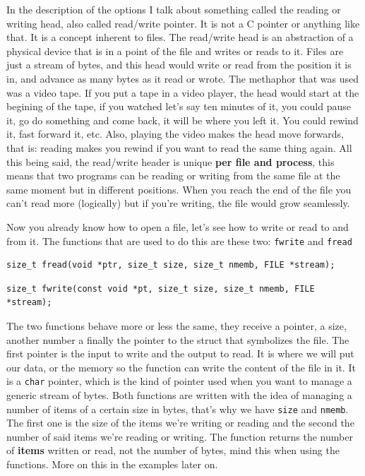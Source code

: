\documentclass[a4paper]{article}
\begin{document}
In the description of the options I talk about something called the reading or
writing head, also called read/write pointer. It is not a C pointer or anything
like that. It is a concept inherent to files. The read/write head is an abstraction
of a physical device that is in a point of the file and writes or reads to it.
Files are just a stream of bytes, and this head would write or read from the
position it is in, and advance as many bytes as it read or wrote. The methaphor
that was used was a video tape. If you put a tape in a video player, the head
would start at the begining of the tape, if you watched let's say ten minutes
of it, you could pause it, go do something and come back, it will be where you
left it. You could rewind it, fast forward it, etc. Also, playing the video
makes the head move forwards, that is: reading makes you rewind if you want
to read the same thing again.
All this being said, the read/write header is unique \textbf{per
file and process}, this means that two programs can be reading or writing from
the same file at the same moment but in different positions.
When you reach the end of the file you can't
read more (logically) but if you're writing, the file would grow seamlessly.

Now you already know how to open a file, let's see how to write or read to and
from it. The functions that are used to do this are these two: \verb!fwrite!
and \verb!fread!

\noindent
\begin{minipage}[H]{\linewidth}
\mbox{}
\begin{lstlisting}[style=C,
caption={\texttt{fread} function signature},
label={lst:freadSignature}]
size_t fread(void *ptr, size_t size, size_t nmemb, FILE *stream);
\end{lstlisting}
\end{minipage}

\noindent
\begin{minipage}[H]{\linewidth}
\mbox{}
\begin{lstlisting}[style=C,
caption={\texttt{fwrite} function signature},
label={lst:fwriteSignature}]
size_t fwrite(const void *pt, size_t size, size_t nmemb, FILE *stream);
\end{lstlisting}
\end{minipage}

The two functions behave more or less the same, they receive a pointer, a size,
another number a finally the pointer to the struct that symbolizes the file.
The first pointer is the input to write and the output to read. It is where we
will put our data, or the memory so the function can write the content
of the file in it. It is a \verb!char! pointer, which is the kind of pointer
used when you want to manage a generic stream of bytes. Both functions are
written with the idea of managing a number of items of a certain size in
bytes, that's why we have \verb!size! and \verb!nmemb!. The first one is the
size of the items we're writing or reading and the second the number
of said items we're reading or writing. The function returns the number of
\textbf{items} written or read, not the number of bytes, mind this when
using the functions.
More on this in the examples later on.
\end{document}
